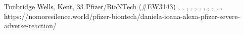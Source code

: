           {
            Tunbridge Wells, Kent, 
          }
          {
            33
          }
          {
            Pfizer/BioNTech
          }
          {
             (\#EW3143)
          }
          {
            ,
            ,
            ,
            ,
            ,
            ,
            ,
            ,
            ,
            ,
            ,
          }
          {
            https://nomoresilence.world/pfizer-biontech/daniela-ioana-alexa-pfizer-severe-adverse-reaction/
          }

